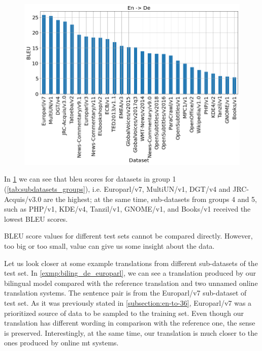 \begin{figure}[h]
	\centering
	\includegraphics[width=0.9\columnwidth]{img/bilingual_en_de.png}
	\label{fig:bilingual_en_de}
\end{figure}


\cleardoublepage

In \cref{fig:bilingual_en_de} we can see that \acrshort{bleu} scores
for datasets in group 1 (\cref{tab:subdatasets_groups}), i.e.
Europarl/v7, MultiUN/v1, DGT/v4 and JRC-Acquis/v3.0 are the highest;
at the same time, sub-datasets from groups 4 and 5, such as PHP/v1, KDE/v4,
Tanzil/v1, GNOME/v1, and Books/v1 received the lowest BLEU scores.

BLEU score values for different test sets cannot be compared directly.
However, too big or too small, value can give us some insight about the
data.

Let us look closer at some example translations from different
sub-datasets of the  test set.
In \cref{exmp:biling_de_europarl}, we can see a translation produced
by our bilingual  model compared with the reference translation
and two unnamed online translation systems.
The sentence pair is from the Europarl/v7 sub-dataset of
 test set.
As it was previously stated in \cref{subsection:en-to-36}, Europarl/v7 was a prioritized
source of data to be sampled to the training set.
Even though our translation has different wording in comparison with the reference one,
the sense is preserved.
Interestingly, at the same time, our translation is much closer
to the ones produced by online \acrshort{mt} systems.

